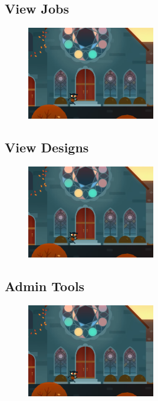 \documentclass[oneside,openany,11pt,a4paper]{report}
\begin{document}
\subsection{View Jobs}
\begin{figure}[H]
	\centering
	\includegraphics[width=0.5\textwidth]{sd7.png}
	\caption{}
\end{figure}

\subsection{View Designs}
\begin{figure}[H]
	\centering
	\includegraphics[width=0.5\textwidth]{sd8.png}
	\caption{}
\end{figure}

\subsection{Admin Tools}
\begin{figure}[H]
	\centering
	\includegraphics[width=0.5\textwidth]{sd9.png}
	\caption{}
\end{figure}
\end{document}
